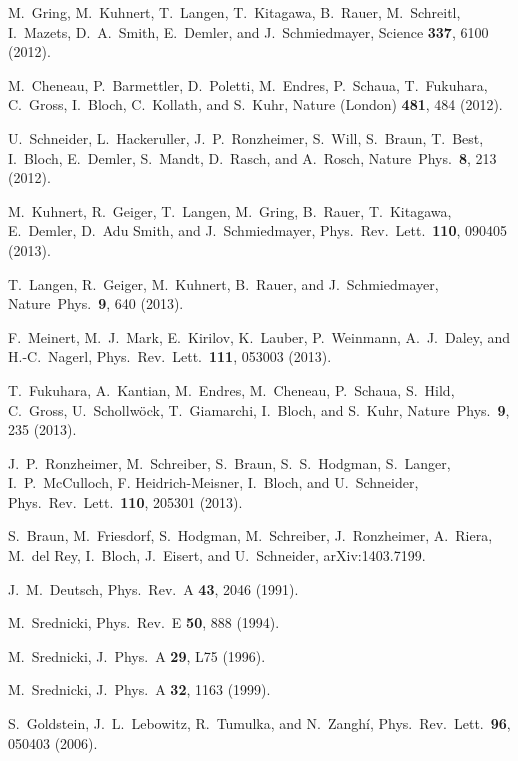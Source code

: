 \documentclass[twocolumn,superscriptaddress,prb,10pt]{revtex4-1}
\begin{document}
\begin{thebibliography}{99}
M.~Gring, M.~Kuhnert, T.~Langen, T.~Kitagawa, B.~Rauer, M.~Schreitl, 
I.~Mazets, D.~A.~Smith, E.~Demler, and J.~Schmiedmayer, Science {\bf 337}, 
6100 (2012).

M.~Cheneau, P.~Barmettler, D.~Poletti, M.~Endres, P.~Schaua, T.~Fukuhara, 
C.~Gross, I.~Bloch, C.~Kollath, and S.~Kuhr, Nature (London) {\bf 481}, 
484 (2012).

U.~Schneider, L.~Hackeruller, J.~P.~Ronzheimer, S.~Will, S.~Braun, T.~Best, 
I.~Bloch, E.~Demler, S.~Mandt, D.~Rasch, and A.~Rosch, Nature\ Phys.\ 
{\bf 8}, 213 (2012).

M.~Kuhnert, R.~Geiger, T.~Langen, M.~Gring, B.~Rauer,
T.~Kitagawa, E.~Demler, D.~Adu Smith, and J.~Schmiedmayer, Phys.\ Rev.\ 
Lett.\ {\bf 110}, 090405 (2013).

T.~Langen, R.~Geiger, M.~Kuhnert, B.~Rauer, and J.~Schmiedmayer, 
Nature\ Phys.\ {\bf 9}, 640 (2013).

F.~Meinert, M.~J.~Mark, E.~Kirilov, K.~Lauber, P.~Weinmann, 
A.~J.~Daley, and H.-C.~Nagerl, Phys.\ Rev.\ Lett.\ {\bf 111}, 
053003 (2013).

T.~Fukuhara, A.~Kantian, M.~Endres, M.~Cheneau, P.~Schaua, S.~Hild, C.~Gross, 
U.~Schollw\"ock, T.~Giamarchi, I.~Bloch, and S.~Kuhr, Nature\ Phys.\ {\bf 9}, 
235 (2013).

J.~P.~Ronzheimer, M.~Schreiber, S.~Braun, S.~S.~Hodgman, S.~Langer, I.~P.~McCulloch, 
F. Heidrich-Meisner, I.~Bloch, and U.~Schneider, Phys.\ Rev.\ Lett.\ {\bf 110}, 
205301 (2013).

S.~Braun, M.~Friesdorf, S.~Hodgman, M.~Schreiber, J.~Ronzheimer, A.~Riera, M.~del Rey, 
I.~Bloch, J.~Eisert, and U.~Schneider, arXiv:1403.7199.


J.~M.~Deutsch, Phys.\ Rev.\ A {\bf 43}, 2046 (1991).

M.~Srednicki, Phys.\ Rev.\ E {\bf 50}, 888 (1994). 

M.~Srednicki, J.\ Phys.\ A {\bf 29}, L75 (1996).

M.~Srednicki, J.\ Phys.\ A {\bf 32}, 1163 (1999).  

S.~Goldstein, J.~L.~Lebowitz, R.~Tumulka, and N.~Zangh\'i, 
Phys.\ Rev.\ Lett.\ {\bf 96}, 050403 (2006). 


\end{thebibliography}
\end{document}
